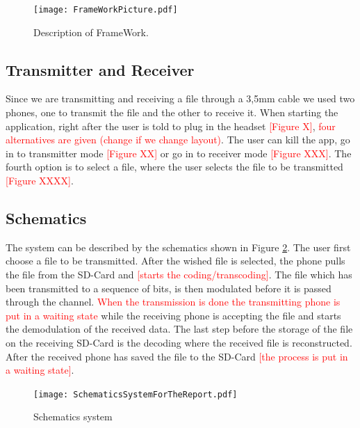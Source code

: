 \documentclass[12pt,a4paper,openright]{article}
\begin{document}
 \begin{figure}[H]
  \centering
    \texttt{[image: FrameWorkPicture.pdf]}
    \caption{Description of FrameWork. }
    \label{fig:FrameWorkPicture}
\end{figure}



\subsection{Transmitter and Receiver}

Since we are transmitting and receiving a file through a 3,5mm cable we used two phones, one to transmit the file and the other to receive it. When starting the application, right after the user is told to plug in the headset \textcolor{red}{[Figure X]}, \textcolor{red}{four alternatives are given (change if we change layout)}. The user can kill the app, go in to transmitter mode \textcolor{red}{[Figure XX]} or go in to receiver mode \textcolor{red}{[Figure XXX]}. The fourth option is to select a file, where the user selects the file to be transmitted \textcolor{red}{[Figure XXXX]}. 

\subsection{Schematics}

The system can be described by the schematics shown in Figure \ref{fig:SchematicsSystem}. The user first choose a file to be transmitted. After the wished file is selected, the phone pulls the file from the SD-Card and \textcolor{red}{[starts the coding/transcoding]}. The file which has been transmitted to a sequence of bits, is then modulated before it is passed through the channel. \textcolor{red}{When the transmission is done the transmitting phone is put in a waiting state} while the receiving phone is accepting the file and starts the demodulation of the received data. The last step before the storage of the file on the receiving SD-Card is the decoding where the received file is reconstructed. After the received phone has saved the file to the SD-Card \textcolor{red}{[the process is put in a waiting state]}.

 \begin{figure}[H]
  \centering
    \texttt{[image: SchematicsSystemForTheReport.pdf]}
    \caption{Schematics system}
    \label{fig:SchematicsSystem}
\end{figure}

 
\end{document}
